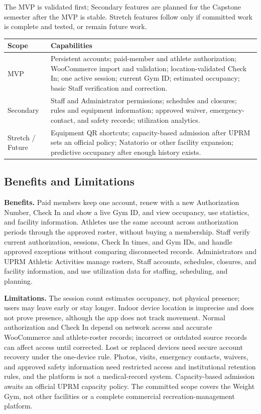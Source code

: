 The MVP is validated first; Secondary features are planned for the Capstone semester after the MVP is stable. Stretch features follow only if committed work is complete and tested, or remain future work.

\begin{center}
\small
\begin{tabularx}{0.95\textwidth}{L{2.4cm} X}
\toprule
\textbf{Scope} & \textbf{Capabilities} \\
\midrule
MVP & Persistent accounts; paid-member and athlete authorization; WooCommerce import and validation; location-validated Check In; one active  session; current Gym ID; estimated occupancy; basic Staff verification and correction. \\
\addlinespace
Secondary & Staff and Administrator permissions; schedules and closures; rules and equipment information; approved waiver, emergency-contact, and safety records; utilization analytics. \\
\addlinespace
Stretch / Future & Equipment QR shortcuts; capacity-based admission after UPRM sets an official policy; Natatorio or other facility expansion; predictive occupancy after enough history exists. \\
\bottomrule
\end{tabularx}
\end{center}

\subsection{Benefits and Limitations}

\textbf{Benefits.} Paid members keep one account, renew with a new Authorization Number, Check In and show a live Gym ID, and view occupancy, use statistics, and facility information. Athletes use the same account across authorization periods through the approved roster, without buying a membership. Staff verify current authorization, sessions, Check In times, and Gym IDs, and handle approved exceptions without comparing disconnected records. Administrators and UPRM Athletic Activities manage rosters, Staff accounts, schedules, closures, and facility information, and use utilization data for staffing, scheduling, and planning.

\textbf{Limitations.} The  session count estimates occupancy, not physical presence; users may leave early or stay longer. Indoor device location is imprecise and does not prove presence, although the app does not track movement. Normal authorization and Check In depend on network access and accurate WooCommerce and athlete-roster records; incorrect or outdated source records can affect access until corrected. Lost or replaced devices need secure account recovery under the one-device rule. Photos, visits, emergency contacts, waivers, and approved safety information need restricted access and institutional retention rules, and the platform is not a medical-record system. Capacity-based admission awaits an official UPRM capacity policy. The committed scope covers the Weight Gym, not other facilities or a complete commercial recreation-management platform.

